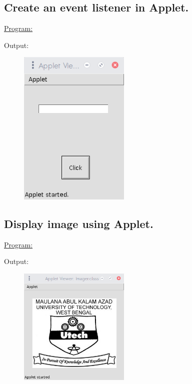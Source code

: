 \documentclass[a4paper,11pt]{article}
\begin{document}
\bigskip

\subsection{Create an event listener in Applet.}
\underline{Program:}


Output:
\begin{figure}[H]
\centering
\includegraphics[width=150pt,height=\textheight,keepaspectratio]{../assign2/pics/6.png}
\end{figure}

\bigskip

\subsection{Display image using Applet.}
\underline{Program:}


Output:
\begin{figure}[H]
\centering
\includegraphics[width=150pt,height=\textheight,keepaspectratio]{../assign2/pics/7.png}
\end{figure}
\end{document}
